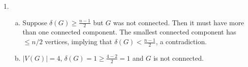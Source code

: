 \documentclass[11pt]{article}
\begin{document}
\begin{enumerate}[1.]
    \item %
        \begin{enumerate}[a)]
            \item
                Suppose $\delta(G) \geq \frac{n-1}{2}$ but $G$ was not connected.
                Then it must have more than one connected component. The smallest
                connected component has $\leq n/2$ vertices, implying that 
                $\delta(G) < \frac{n-1}{2}$, a contradiction. 
            \item

            $|V(G)| = 4$, $\delta(G) = 1 \geq \frac{4 - 2}{2} = 1$ and $G$ is 
            not connected. 
        \end{enumerate}

\end{enumerate}
\end{document}
